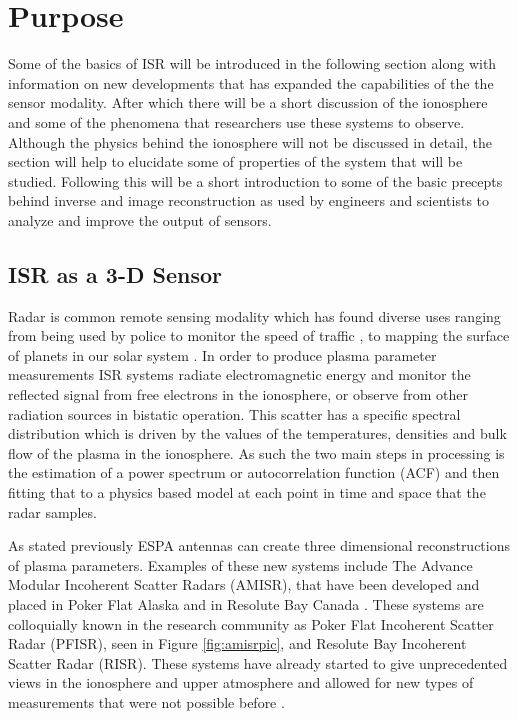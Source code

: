 \section{Purpose}
Some of the basics of ISR will be introduced in the following section along with information on new developments that has expanded the capabilities of the the sensor modality. After which there will be a short discussion of the ionosphere and some of the phenomena that researchers use these systems to observe. Although the physics behind the ionosphere will not be discussed in detail, the section will help to elucidate some of properties of the system that will be studied. Following this will be a short introduction to some of the basic precepts behind inverse and image reconstruction as used by engineers and scientists to analyze and improve the output of sensors.

\subsection{ISR as a 3-D Sensor}
Radar is common remote sensing modality which has found diverse uses ranging from being used by police to monitor the speed of traffic \cite{richards2010principles}, to mapping the surface of planets in our solar system \cite{campbell2002radar}. In order to produce plasma parameter measurements ISR systems radiate electromagnetic energy and monitor the reflected signal from free electrons in the ionosphere, or observe from other radiation sources in bistatic operation. This scatter has a specific spectral distribution which is driven by the values of the temperatures, densities and bulk flow of the plasma in the ionosphere. As such the two main steps in processing is the estimation of a power spectrum or autocorrelation function (ACF) and then fitting that to a physics based model at each point in time and space that the radar samples. 

As stated previously ESPA antennas can create three dimensional reconstructions of plasma parameters. Examples of these new systems include The Advance Modular Incoherent Scatter Radars (AMISR), that have been developed and placed in Poker Flat Alaska and in Resolute Bay Canada \cite{Semeter2009738}. These systems are colloquially known in the research community as Poker Flat Incoherent Scatter Radar (PFISR), seen in Figure \ref{fig:amisrpic}, and Resolute Bay Incoherent Scatter Radar (RISR). These systems have already started to give unprecedented views in the ionosphere and upper atmosphere and allowed for new types of measurements that were not possible before \cite{semeter2010CI,butler:imagingfregiondrifts,Nicolls:2007ie}. %

